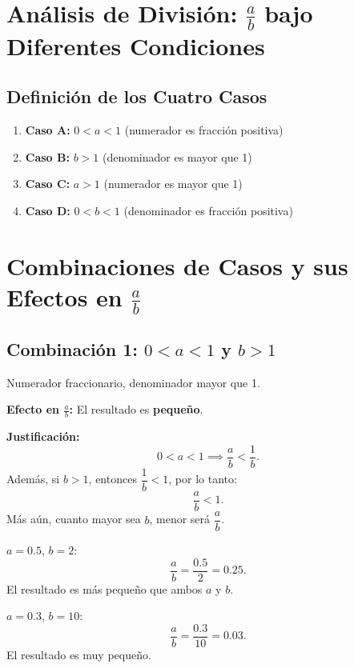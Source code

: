 
\section{Análisis de División: $\frac{a}{b}$ bajo Diferentes Condiciones}

\subsection{Definición de los Cuatro Casos}

\begin{enumerate}
\item \textbf{Caso A:} $0 < a < 1$ (numerador es fracción positiva)
\item \textbf{Caso B:} $b > 1$ (denominador es mayor que 1)
\item \textbf{Caso C:} $a > 1$ (numerador es mayor que 1)
\item \textbf{Caso D:} $0 < b < 1$ (denominador es fracción positiva)
\end{enumerate}

\section*{Combinaciones de Casos y sus Efectos en $\frac{a}{b}$}

\subsection{Combinación 1: $0 < a < 1$ y $b > 1$}

\begin{caso}
Numerador fraccionario, denominador mayor que 1.
\end{caso}

\textbf{Efecto en $\frac{a}{b}$:} El resultado es \textbf{pequeño}.

\textbf{Justificación:}
\[
0 < a < 1 \implies \frac{a}{b} < \frac{1}{b}.
\]
Además, si $b > 1$, entonces $\dfrac{1}{b} < 1$, por lo tanto:
\[
\frac{a}{b} < 1.
\]
Más aún, cuanto mayor sea $b$, menor será $\dfrac{a}{b}$.

\begin{ejemplo}
$a = 0.5$, $b = 2$:
\[
\frac{a}{b} = \frac{0.5}{2} = 0.25.
\]
El resultado es más pequeño que ambos $a$ y $b$.
\end{ejemplo}

\begin{ejemplo}
$a = 0.3$, $b = 10$:
\[
\frac{a}{b} = \frac{0.3}{10} = 0.03.
\]
El resultado es muy pequeño.
\end{ejemplo}

